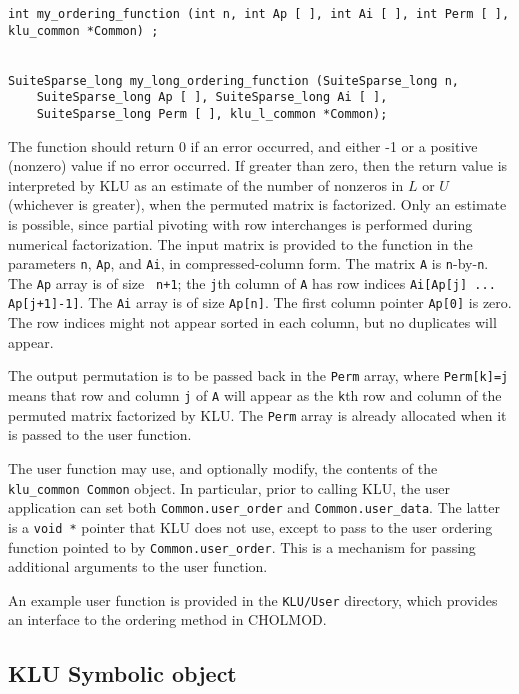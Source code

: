 \documentclass[11pt]{article}
\begin{document}
\begin{itemize}
{\footnotesize
\begin{verbatim}
int my_ordering_function (int n, int Ap [ ], int Ai [ ], int Perm [ ], klu_common *Common) ;


SuiteSparse_long my_long_ordering_function (SuiteSparse_long n,
    SuiteSparse_long Ap [ ], SuiteSparse_long Ai [ ],
    SuiteSparse_long Perm [ ], klu_l_common *Common);
\end{verbatim}
}

The function should return 0 if an error occurred, and either -1 or a positive
(nonzero) value if no error occurred.  If greater than zero, then the return
value is interpreted by KLU as an estimate of the number of nonzeros in $L$ or
$U$ (whichever is greater), when the permuted matrix is factorized.  Only an
estimate is possible, since partial pivoting with row interchanges is performed
during numerical factorization.  The input matrix is provided to the function
in the parameters {\tt n}, {\tt Ap}, and {\tt Ai}, in compressed-column form.
The matrix {\tt A} is {\tt n}-by-{\tt n}.  The {\tt Ap} array is of size {\tt
n+1}; the {\tt j}th column of {\tt A} has row indices {\tt Ai[Ap[j] ...
Ap[j+1]-1]}.  The {\tt Ai} array is of size {\tt Ap[n]}.  The first column
pointer {\tt Ap[0]} is zero.  The row indices might not appear sorted in each
column, but no duplicates will appear.

The output permutation is to be passed back in the {\tt Perm} array, where
{\tt Perm[k]=j} means that row and column {\tt j} of {\tt A} will appear as
the {\tt k}th row and column of the permuted matrix factorized by KLU.  The
{\tt Perm} array is already allocated when it is passed to the user function.

The user function may use, and optionally modify, the contents of the {\tt
klu\_common Common} object.  In particular, prior to calling KLU, the user
application can set both {\tt Common.user\_order} and {\tt Common.user\_data}.
The latter is a {\tt void *} pointer that KLU does not use, except to pass to
the user ordering function pointed to by {\tt Common.user\_order}.  This is a
mechanism for passing additional arguments to the user function.

An example user function is provided in the {\tt KLU/User} directory, which
provides an interface to the ordering method in CHOLMOD.

\end{itemize}

\subsection{KLU Symbolic object}
\end{document}
